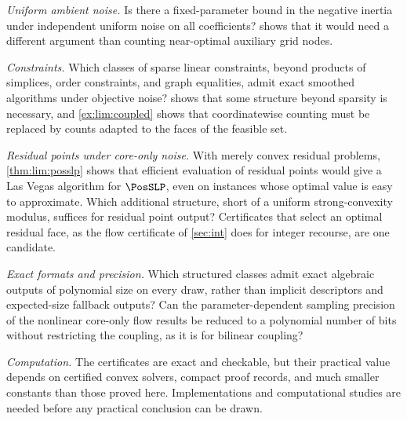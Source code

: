 \emph{Uniform ambient noise.} Is there a fixed-parameter bound in the negative
inertia under independent uniform noise on all coefficients?
 shows that it would need a different argument than
counting near-optimal auxiliary grid nodes.

\emph{Constraints.} Which classes of sparse linear constraints, beyond
products of simplices, order constraints, and graph equalities, admit exact
smoothed algorithms under objective noise?  shows
that some structure beyond sparsity is necessary, and
\cref{ex:lim:coupled} shows that coordinatewise counting must be replaced by
counts adapted to the faces of the feasible set.

\emph{Residual points under core-only noise.} With merely convex residual
problems, \cref{thm:lim:posslp} shows that efficient evaluation of residual
points would give a Las Vegas algorithm for $\PosSLP$, even on instances
whose optimal value is easy to approximate. Which additional structure,
short of a uniform strong-convexity modulus, suffices for residual point
output? Certificates that select an optimal residual face, as the flow
certificate of \cref{sec:int} does for integer recourse, are one candidate.

\emph{Exact formats and precision.} Which structured classes admit exact
algebraic outputs of polynomial size on every draw, rather than implicit
descriptors and expected-size fallback outputs? Can the parameter-dependent
sampling precision of the nonlinear core-only flow results be reduced to a
polynomial number of bits without restricting the coupling, as it is for
bilinear coupling?

\emph{Computation.} The certificates are exact and checkable, but their
practical value depends on certified convex solvers, compact proof records,
and much smaller constants than those proved here. Implementations and
computational studies are needed before any practical conclusion can be
drawn.
